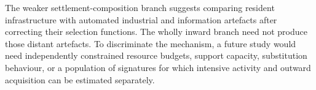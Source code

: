 The weaker settlement-composition branch suggests comparing resident infrastructure with automated industrial and information artefacts after correcting their selection functions. The wholly inward branch need not produce those distant artefacts. To discriminate the mechanism, a future study would need independently constrained resource budgets, support capacity, substitution behaviour, or a population of signatures for which intensive activity and outward acquisition can be estimated separately. 


